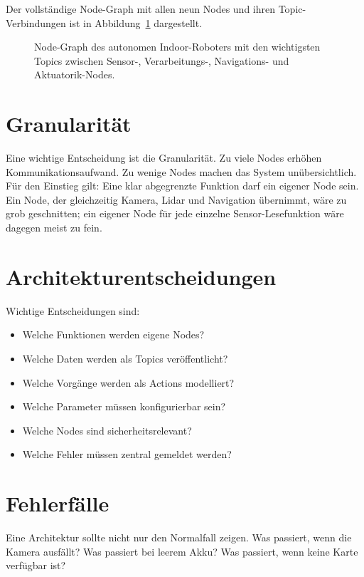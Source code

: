 Der vollständige Node-Graph mit allen neun Nodes und ihren Topic-Verbindungen ist in Abbildung~\ref{fig:kap15-node-graph} dargestellt.

\begin{figure}[H]
  \centering
  \caption{Node-Graph des autonomen Indoor-Roboters mit den wichtigsten Topics zwischen Sensor-, Verarbeitungs-, Navigations- und Aktuatorik-Nodes.}
  \label{fig:kap15-node-graph}
\end{figure}

\section{Granularität}
Eine wichtige Entscheidung ist die Granularität. Zu viele Nodes erhöhen Kommunikationsaufwand. Zu wenige Nodes machen das System unübersichtlich. Für den Einstieg gilt: Eine klar abgegrenzte Funktion darf ein eigener Node sein. Ein Node, der gleichzeitig Kamera, Lidar und Navigation übernimmt, wäre zu grob geschnitten; ein eigener Node für jede einzelne Sensor-Lesefunktion wäre dagegen meist zu fein.

\section{Architekturentscheidungen}
Wichtige Entscheidungen sind:

\begin{itemize}
    \item Welche Funktionen werden eigene Nodes?
    \item Welche Daten werden als Topics veröffentlicht?
    \item Welche Vorgänge werden als Actions modelliert?
    \item Welche Parameter müssen konfigurierbar sein?
    \item Welche Nodes sind sicherheitsrelevant?
    \item Welche Fehler müssen zentral gemeldet werden?
\end{itemize}

\section{Fehlerfälle}
Eine Architektur sollte nicht nur den Normalfall zeigen. Was passiert, wenn die Kamera ausfällt? Was passiert bei leerem Akku? Was passiert, wenn keine Karte verfügbar ist?

